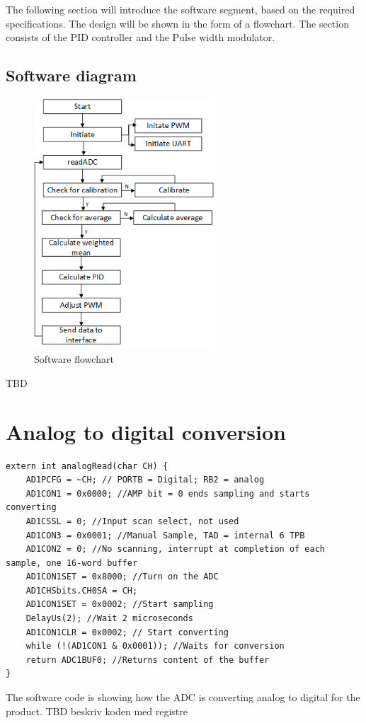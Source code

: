 
The following section will introduce the software segment, based on the required specifications. The design will be shown in the form of a flowchart.
The section consists of the PID controller and the Pulse width modulator.

\subsection{Software diagram}

\begin{figure}[h!]
  \centering
  \includegraphics[width=0.6\textwidth]{figures/softwareflowchart.png}  
\caption{Software flowchart}  
  \label{Softwareflowchart}
\end{figure}
TBD

\newpage
\section{Analog to digital conversion}


\begin{lstlisting}
extern int analogRead(char CH) {
    AD1PCFG = ~CH; // PORTB = Digital; RB2 = analog
    AD1CON1 = 0x0000; //AMP bit = 0 ends sampling and starts converting
    AD1CSSL = 0; //Input scan select, not used
    AD1CON3 = 0x0001; //Manual Sample, TAD = internal 6 TPB
    AD1CON2 = 0; //No scanning, interrupt at completion of each sample, one 16-word buffer
    AD1CON1SET = 0x8000; //Turn on the ADC
    AD1CHSbits.CH0SA = CH;
    AD1CON1SET = 0x0002; //Start sampling
    DelayUs(2); //Wait 2 microseconds
    AD1CON1CLR = 0x0002; // Start converting
    while (!(AD1CON1 & 0x0001)); //Waits for conversion
    return ADC1BUF0; //Returns content of the buffer	
}
\end{lstlisting}
The software code is showing how the ADC is converting analog to digital for the product. TBD beskriv koden med registre

